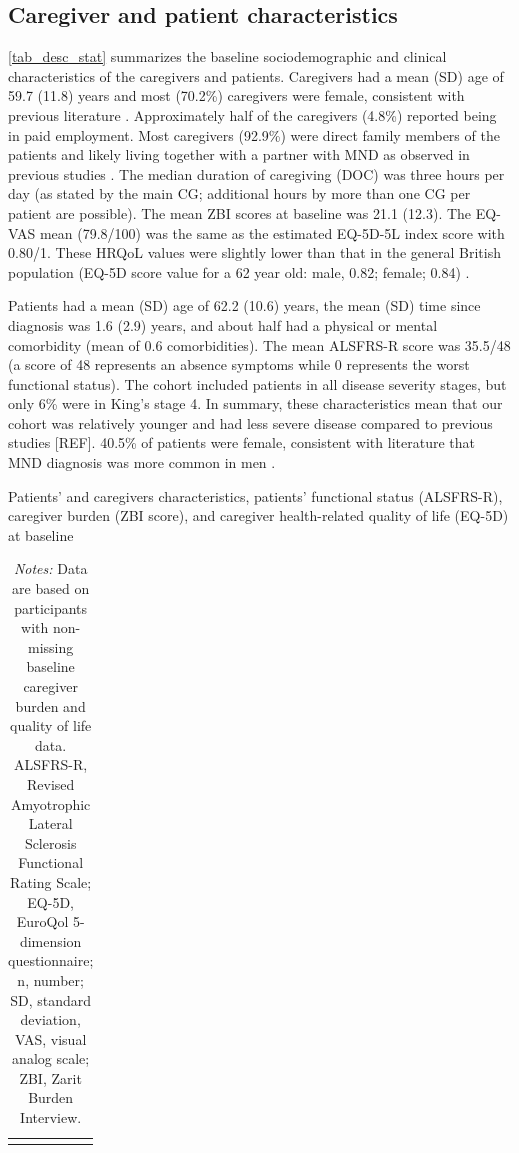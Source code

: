 \documentclass[12pt]{article}
\begin{document}
\subsection*{Caregiver and patient characteristics}
\autoref{tab_desc_stat} summarizes the baseline sociodemographic and clinical characteristics of the caregivers and patients. Caregivers had a mean (SD) age of 59.7 (11.8) years and most (70.2\%) caregivers were female, consistent with previous literature \parencite{schischlevskij_informal_2021}. Approximately half of the caregivers (4.8\%) reported being in paid employment.  Most caregivers (92.9\%) were direct family members of the patients and likely living together with a partner with MND as observed in previous studies \parencite{burke_longitudinal_2018, galvin_caregiving_2016, schischlevskij_informal_2021}. The median duration of caregiving (DOC) was three hours per day (as stated by the main CG; additional hours by more than one CG per patient are possible).  The mean ZBI scores at baseline was 21.1 (12.3). The EQ-VAS mean (79.8/100) was the same as the estimated EQ-5D-5L index score with 0.80/1. These HRQoL values were slightly lower than that in the general British population (EQ-5D score value for a 62 year old: male, 0.82; female; 0.84) \parencite{hernandez_alava_estimating_2022}.  

Patients had a mean (SD) age of 62.2 (10.6) years, the mean (SD) time since diagnosis was 1.6 (2.9) years, and about half had a physical or mental comorbidity (mean of 0.6 comorbidities). The mean ALSFRS-R score was 35.5/48 (a score of 48 represents an absence symptoms while 0 represents the worst functional status). The cohort included patients in all disease severity stages, but only 6\% were in King's stage 4. In summary, these characteristics mean that our cohort was relatively younger and had less severe disease compared to previous studies [REF]. 40.5\% of patients were female, consistent with literature that MND diagnosis was more common in men \parencite{burchardt_analysis_2022}.

\begin{table}[H]
    \centering \singlespacing \small
    \caption{Patients’ and caregivers characteristics, patients' functional status (ALSFRS-R), caregiver burden (ZBI score), and caregiver health-related quality of life (EQ-5D) at baseline}
    \begin{tabular}{|L{5cm}|R{3.2cm}|}
        \hline
    \end{tabular}
    \label{tab_desc_stat}
    \caption*{\footnotesize \textit{Notes:} Data are based on participants with non-missing baseline caregiver burden and quality of life data. ALSFRS-R, Revised Amyotrophic Lateral Sclerosis Functional Rating Scale; EQ-5D, EuroQol 5-dimension questionnaire; n, number; SD, standard deviation, VAS, visual analog scale; ZBI, Zarit Burden Interview.
}
\end{table}
\end{document}
